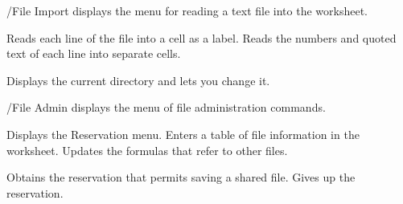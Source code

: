 /File Import displays the menu for reading a text file into the worksheet.
\begin{Options}
 Reads each line of the file into a cell
  as a label.
 Reads the numbers and quoted text of
  each line into separate cells.
\end{Options}

Displays the current directory and lets you change it.

/File Admin displays the menu of file administration commands.
\begin{Options}
 Displays the Reservation menu.
 Enters a table of file information in
  the worksheet.
 Updates the formulas that refer
  to other files.
\end{Options}
\begin{Options}
 Obtains the reservation that permits
  saving a shared file.
 Gives up the reservation.
\end{Options}
